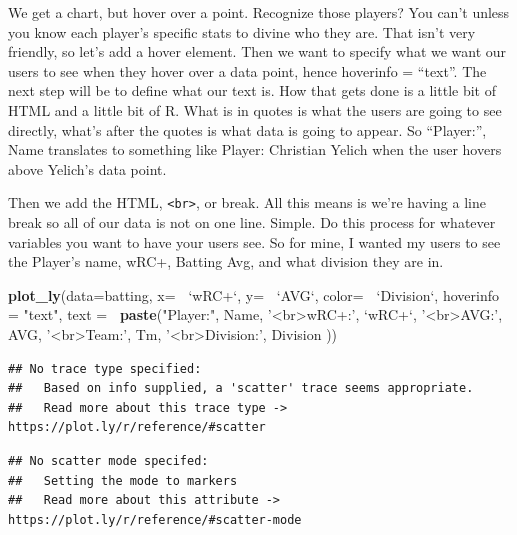 \documentclass[
]{book}
\newenvironment{Shaded}{\begin{snugshade}}{\end{snugshade}}
\newcommand{\DataTypeTok}[1]{\textcolor[rgb]{0.13,0.29,0.53}{#1}}
\newcommand{\KeywordTok}[1]{\textcolor[rgb]{0.13,0.29,0.53}{\textbf{#1}}}
\newcommand{\NormalTok}[1]{#1}
\newcommand{\OperatorTok}[1]{\textcolor[rgb]{0.81,0.36,0.00}{\textbf{#1}}}
\newcommand{\StringTok}[1]{\textcolor[rgb]{0.31,0.60,0.02}{#1}}
\begin{document}
We get a chart, but hover over a point. Recognize those players? You can't unless you know each player's specific stats to divine who they are. That isn't very friendly, so let's add a hover element. Then we want to specify what we want our users to see when they hover over a data point, hence hoverinfo = ``text''. The next step will be to define what our text is. How that gets done is a little bit of HTML and a little bit of R. What is in quotes is what the users are going to see directly, what's after the quotes is what data is going to appear. So ``Player:'', Name translates to something like Player: Christian Yelich when the user hovers above Yelich's data point.

Then we add the HTML, \texttt{\textless{}br\textgreater{}}, or break. All this means is we're having a line break so all of our data is not on one line. Simple. Do this process for whatever variables you want to have your users see. So for mine, I wanted my users to see the Player's name, wRC+, Batting Avg, and what division they are in.

\begin{Shaded}
\begin{Highlighting}[]
\KeywordTok{plot_ly}\NormalTok{(}\DataTypeTok{data=}\NormalTok{batting, }\DataTypeTok{x=} \OperatorTok{~}\StringTok{`}\DataTypeTok{wRC+}\StringTok{`}\NormalTok{, }\DataTypeTok{y=} \OperatorTok{~}\StringTok{`}\DataTypeTok{AVG}\StringTok{`}\NormalTok{, }\DataTypeTok{color=} \OperatorTok{~}\StringTok{`}\DataTypeTok{Division}\StringTok{`}\NormalTok{,}
        \DataTypeTok{hoverinfo =} \StringTok{"text"}\NormalTok{,}
        \DataTypeTok{text =} \OperatorTok{~}\KeywordTok{paste}\NormalTok{(}\StringTok{"Player:"}\NormalTok{, Name,}
                      \StringTok{'<br>wRC+:'}\NormalTok{, }\StringTok{`}\DataTypeTok{wRC+}\StringTok{`}\NormalTok{,}
                      \StringTok{'<br>AVG:'}\NormalTok{, AVG,}
                      \StringTok{'<br>Team:'}\NormalTok{, Tm,}
                      \StringTok{'<br>Division:'}\NormalTok{, Division}
\NormalTok{                      ))}
\end{Highlighting}
\end{Shaded}

\begin{verbatim}
## No trace type specified:
##   Based on info supplied, a 'scatter' trace seems appropriate.
##   Read more about this trace type -> https://plot.ly/r/reference/#scatter
\end{verbatim}

\begin{verbatim}
## No scatter mode specifed:
##   Setting the mode to markers
##   Read more about this attribute -> https://plot.ly/r/reference/#scatter-mode
\end{verbatim}
\end{document}
